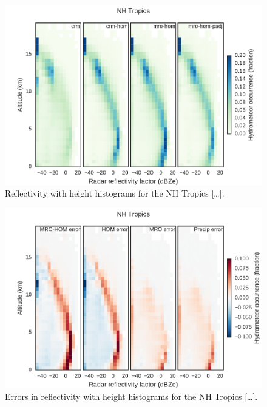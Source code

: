 \begin{figure}[htbp]
\centering
\includegraphics{graphics/subgrid1_cfadDbze94_NHTropics.pdf}
\caption{\label{fig:subgrid1_cfadDbze94_tropics}Reflectivity with height
histograms for the NH Tropics
{[}\ldots{}{]}.}\label{fig:subgrid1ux5fcfadDbze94ux5ftropics}
\end{figure}

\begin{figure}[htbp]
\centering
\includegraphics{graphics/subgrid1_cfadDbze94_NHTropics_diff.pdf}
\caption{\label{fig:subgrid1_cfadDbze94_tropics_diff}Errors in
reflectivity with height histograms for the NH Tropics
{[}\ldots{}{]}.}\label{fig:subgrid1ux5fcfadDbze94ux5ftropicsux5fdiff}
\end{figure}

